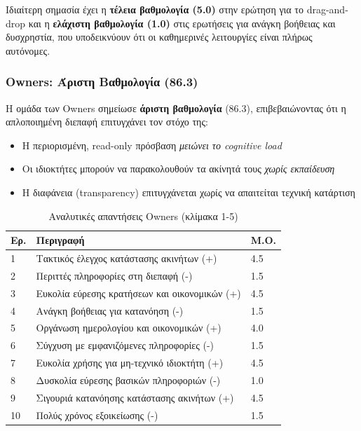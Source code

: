 \documentclass[
	12pt, %
	oneside, %
	greek,
	onehalfspacing, %
	liststotoc, %
	toctotoc, %
	parskip, %
	headsepline, %
]{MastersDoctoralThesis} %
\begin{document}
Ιδιαίτερη σημασία έχει η \textbf{τέλεια βαθμολογία (5.0)} στην ερώτηση για το drag-and-drop και η \textbf{ελάχιστη βαθμολογία (1.0)} στις ερωτήσεις για ανάγκη βοήθειας και δυσχρηστία, που υποδεικνύουν ότι οι καθημερινές λειτουργίες είναι πλήρως αυτόνομες.

\subsubsection{Owners: Άριστη Βαθμολογία (86.3)}

Η ομάδα των Owners σημείωσε \textbf{άριστη βαθμολογία} (86.3), επιβεβαιώνοντας ότι η απλοποιημένη διεπαφή επιτυγχάνει τον στόχο της:

\begin{itemize}
    \item Η περιορισμένη, read-only πρόσβαση \textit{μειώνει το cognitive load}
    \item Οι ιδιοκτήτες μπορούν να παρακολουθούν τα ακίνητά τους \textit{χωρίς εκπαίδευση}
    \item Η διαφάνεια (transparency) επιτυγχάνεται χωρίς να απαιτείται τεχνική κατάρτιση
\end{itemize}

\begin{table}[H]
\centering
\caption{Αναλυτικές απαντήσεις Owners (κλίμακα 1-5)}
\label{tab:sus-owners-detail}
\begin{tabular}{@{}C{1cm}L{9cm}C{1.5cm}@{}}
\toprule
\textbf{Ερ.} & \textbf{Περιγραφή} & \textbf{Μ.Ο.} \\
 & Τακτικός έλεγχος κατάστασης ακινήτων (+) & 4.5 \\
2 & Περιττές πληροφορίες στη διεπαφή (-) & 1.5 \\
3 & Ευκολία εύρεσης κρατήσεων και οικονομικών (+) & 4.5 \\
4 & Ανάγκη βοήθειας για κατανόηση (-) & 1.5 \\
5 & Οργάνωση ημερολογίου και οικονομικών (+) & 4.0 \\
6 & Σύγχυση με εμφανιζόμενες πληροφορίες (-) & 1.5 \\
7 & Ευκολία χρήσης για μη-τεχνικό ιδιοκτήτη (+) & 4.5 \\
8 & Δυσκολία εύρεσης βασικών πληροφοριών (-) & 1.0 \\
9 & Σιγουριά κατανόησης κατάστασης ακινήτων (+) & 4.5 \\
10 & Πολύς χρόνος εξοικείωσης (-) & 1.5 \\
\bottomrule
\end{tabular}
\end{table}
\end{document}
